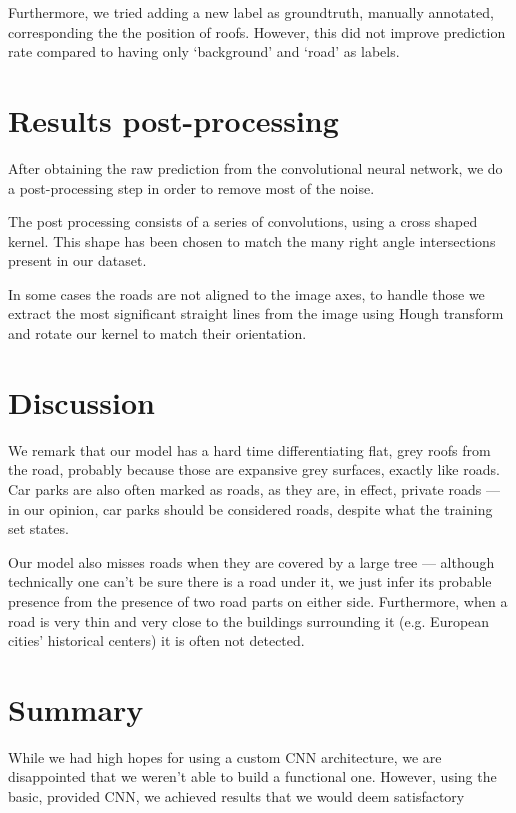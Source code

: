 \documentclass[11pt,conference,compsocconf]{IEEEtran}
\begin{document}
Furthermore, we tried adding a new label as groundtruth, manually annotated, corresponding the the position of roofs. However, this did not improve prediction rate compared to having only `background' and `road' as labels.


\section{Results post-processing}
After obtaining the raw prediction from the convolutional neural network, we do a post-processing step in order to remove most of the noise.

The post processing consists of a series of convolutions, using a cross shaped kernel. This shape has been chosen to match the many right angle intersections present in our dataset.

In some cases the roads are not aligned to the image axes, to handle those we extract the most significant straight lines from the image using Hough transform and rotate our kernel to match their orientation.


\section{Discussion}
We remark that our model has a hard time differentiating flat, grey roofs from the road, probably because those are expansive grey surfaces, exactly like roads. Car parks are also often marked as roads, as they are, in effect, private roads --- in our opinion, car parks should be considered roads, despite what the training set states.

Our model also misses roads when they are covered by a large tree --- although technically one can't be sure there is a road under it, we just infer its probable presence from the presence of two road parts on either side. Furthermore, when a road is very thin and very close to the buildings surrounding it (e.g. European cities' historical centers) it is often not detected.

\section{Summary}
While we had high hopes for using a custom CNN architecture, we are disappointed that we weren't able to build a functional one. However, using the basic, provided CNN, we achieved results that we would deem satisfactory
\end{document}
